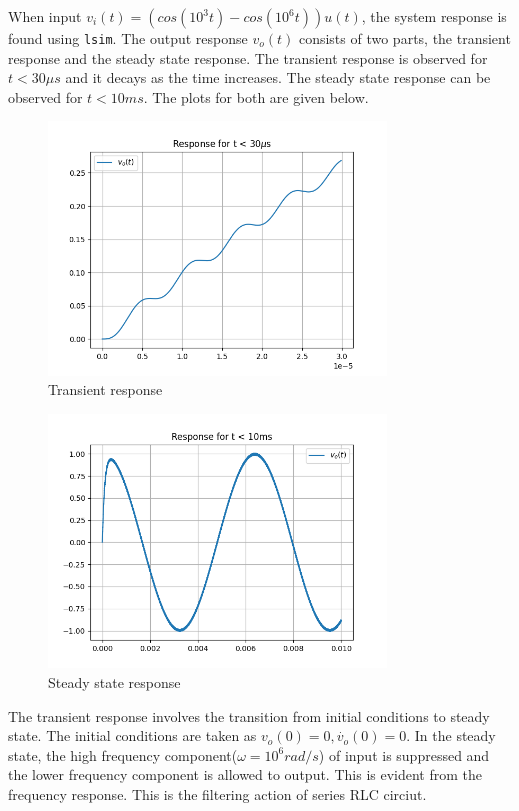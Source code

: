 \documentclass[12pt, a4paper]{article}
\begin{document}
When input $v_i(t) = (cos(10^3t) - cos(10^6t))u(t)$, the system response is found using \texttt{lsim}. The output response $v_o(t)$ consists  of two parts, the transient response and the steady state response. The transient response is observed for $t < 30\mu s$ and it decays as the time increases. The steady state response can be observed for $t < 10ms$. The plots for both are given below.
\begin{figure}[H]
\centering
\includegraphics[width=0.8\textwidth]{Figure_10.png}
\caption{Transient response}
\end{figure}\begin{figure}[H]
\centering
\includegraphics[width=0.8\textwidth]{Figure_11.png}
\caption{Steady state response}
\end{figure}
The transient response involves the transition from initial conditions to steady state. The initial conditions are taken as $v_o(0) = 0, \dot{v_o}(0) = 0$. In the steady state, the high frequency component($\omega	= 10^6 rad/s$) of input is suppressed and the lower frequency component is allowed to output. This is evident from the frequency response. This is the filtering action of series RLC circiut.
\end{document}

